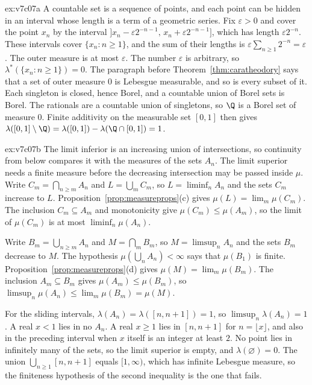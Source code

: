 \begin{solution}{ex:v7c07a}
\idea A countable set is a sequence of points, and each point can be hidden in an interval whose length is a term of a geometric series.
\writeup Fix $\varepsilon>0$ and cover the point $x_n$ by the interval $]x_n-\varepsilon 2^{-n-1},\,x_n+\varepsilon 2^{-n-1}]$, which has length $\varepsilon 2^{-n}$.
These intervals cover $\{x_n:n\ge1\}$, and the sum of their lengths is $\varepsilon\sum_{n\ge1}2^{-n}=\varepsilon$.
The outer measure is at most $\varepsilon$.
The number $\varepsilon$ is arbitrary, so $\lambda^*(\{x_n:n\ge1\})=0$.
The paragraph before Theorem~\ref{thm:caratheodory} says that a set of outer measure $0$ is Lebesgue measurable, and so is every subset of it.
Each singleton is closed, hence Borel, and a countable union of Borel sets is Borel.
The rationals are a countable union of singletons, so $\Q$ is a Borel set of measure $0$.
Finite additivity on the measurable set $[0,1]$ then gives $\lambda([0,1]\setminus\Q)=\lambda([0,1])-\lambda(\Q\cap[0,1])=1$.
\end{solution}

\begin{solution}{ex:v7c07b}
\idea The limit inferior is an increasing union of intersections, so continuity from below compares it with the measures of the sets $A_n$.
The limit superior needs a finite measure before the decreasing intersection may be passed inside $\mu$.
\writeup Write $C_m=\bigcap_{n\ge m}A_n$ and $L=\bigcup_m C_m$, so $L=\liminf_n A_n$ and the sets $C_m$ increase to $L$.
Proposition~\ref{prop:measureprops}(c) gives $\mu(L)=\lim_m\mu(C_m)$.
The inclusion $C_m\subseteq A_m$ and monotonicity give $\mu(C_m)\le\mu(A_m)$, so the limit of $\mu(C_m)$ is at most $\liminf_n\mu(A_n)$.

Write $B_m=\bigcup_{n\ge m}A_n$ and $M=\bigcap_m B_m$, so $M=\limsup_n A_n$ and the sets $B_m$ decrease to $M$.
The hypothesis $\mu(\bigcup_n A_n)<\infty$ says that $\mu(B_1)$ is finite.
Proposition~\ref{prop:measureprops}(d) gives $\mu(M)=\lim_m\mu(B_m)$.
The inclusion $A_m\subseteq B_m$ gives $\mu(A_m)\le\mu(B_m)$, so $\limsup_n\mu(A_n)\le\lim_m\mu(B_m)=\mu(M)$.

For the sliding intervals, $\lambda(A_n)=\lambda([n,n+1])=1$, so $\limsup_n\lambda(A_n)=1$.
A real $x<1$ lies in no $A_n$. A real $x\ge 1$ lies in $[n,n+1]$ for $n=\lfloor x\rfloor$, and also in the preceding interval when $x$ itself is an integer at least $2$. No point lies in infinitely many of the sets, so the limit superior is empty, and $\lambda(\varnothing)=0$.
The union $\bigcup_{n\ge1}[n,n+1]$ equals $[1,\infty)$, which has infinite Lebesgue measure, so the finiteness hypothesis of the second inequality is the one that fails.
\end{solution}

